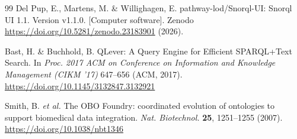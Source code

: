 \documentclass[11pt,a4paper]{article}
\begin{document}
\begin{thebibliography}{99}
Del Pup, E., Martens, M. \& Willighagen, E. pathway-lod/Snorql-UI: Snorql UI 1.1. Version v1.1.0. [Computer software]. Zenodo \url{https://doi.org/10.5281/zenodo.23183901} (2026).

Bast, H. \& Buchhold, B. QLever: A Query Engine for Efficient SPARQL+Text Search. In \textit{Proc. 2017 ACM on Conference on Information and Knowledge Management (CIKM '17)} 647--656 (ACM, 2017). \url{https://doi.org/10.1145/3132847.3132921}

Smith, B. \textit{et al.} The OBO Foundry: coordinated evolution of ontologies to support biomedical data integration. \textit{Nat. Biotechnol.} \textbf{25}, 1251--1255 (2007). \url{https://doi.org/10.1038/nbt1346}

\end{thebibliography}
\end{document}
